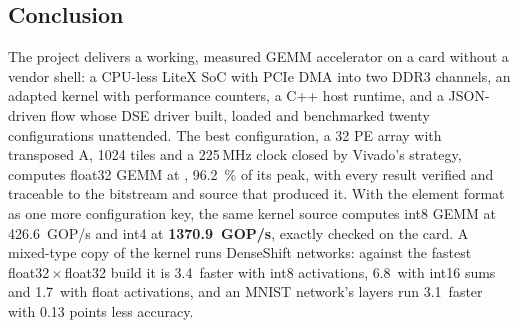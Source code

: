 \subsection{Conclusion}
The project delivers a working, measured GEMM accelerator on a card without a vendor shell: a CPU-less LiteX SoC
with PCIe DMA into two DDR3 channels, an adapted  kernel with performance counters, a C++ host
runtime, and a JSON-driven flow whose DSE driver built, loaded and benchmarked twenty configurations unattended. The
best configuration, a 32 PE array with transposed A, 1024 tiles and a 225\,MHz clock closed by Vivado's
 strategy, computes float32 GEMM at \textbf{}, \SI{96.2}{\percent} of its peak, with
every result verified and traceable to the bitstream and source that produced it. With the element format as one
more configuration key, the same kernel source computes int8 GEMM at \SI{426.6}{GOP/s} and int4 at
\textbf{\SI{1370.9}{GOP/s}}, exactly checked on the card. A mixed-type copy of the kernel runs DenseShift networks:
against the fastest float32\,\(\times\)\,float32 build it is 3.4\x\ faster with int8 activations, 6.8\x\
with int16 sums and 1.7\x\ with float activations, and an MNIST network's layers run 3.1\x\ faster with
0.13 points less accuracy.

